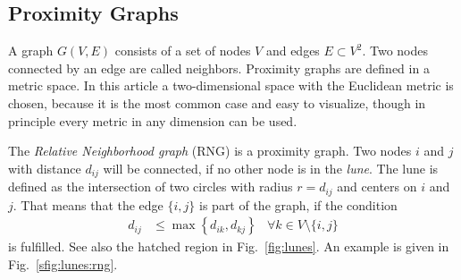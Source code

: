 \label{sec:model}
\subsection{Proximity Graphs}
\label{ssec:graphtypes}
    A graph \(G(V,E)\) consists of a set of nodes \(V\) and edges \(E \subset V^{2}\).
    Two nodes connected by an edge are called neighbors.
    Proximity graphs are defined in a metric space. In this article a
    two-dimensional space with the Euclidean metric is chosen, because
    it is the most common case and easy to visualize, though in principle
    every metric in any dimension can be used.

    The \emph{Relative Neighborhood graph} (RNG) \cite{Toussaint1980} is
    a proximity graph. Two nodes \(i\) and \(j\) with distance $d_{ij}$
    will be connected, if no other node is in the \emph {lune}. The lune
    is defined as the intersection of two circles with radius \(r =
    d_{ij}\) and centers on \(i\) and \(j\). That means that the edge
    $\{i,j\}$ is part of the graph, if the condition
    \begin{align*}
        d_{ij} &\le \max\left\{ d_{ik}, d_{kj} \right\} &\forall k \in V\setminus\{i,j\}
    \end{align*}
    is fulfilled. See also the hatched region
    in Fig.~\ref{fig:lunes}. An example is given in Fig.~\ref{sfig:lunes:rng}.

